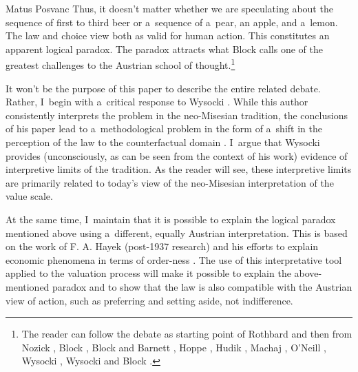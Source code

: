 \begin{artengenv}{Matus Posvanc}
Thus, it doesn't matter whether we are speculating about the sequence of first to third beer or a~sequence of a~pear, an apple, and a~lemon. The law and choice view both as valid for human action. This constitutes an apparent logical paradox. The paradox attracts what Block 
\parencite*[][]{Block1980On} %
 calls one of the greatest challenges to the Austrian school of thought.\footnote{The reader can follow the debate as starting point of Rothbard 
\parencite*[][]{Rothbard1997Toward} %
 and then from Nozick 
\parencite*[][]{Nozick1977On}, %
 Block 
\parencites*[][]{Block1980On}[][]{Block2009Rejoinder}[][]{Block2012Response}, %
 Block and Barnett 
\parencite*[][]{Block2010Rejoinder}, %
 Hoppe 
\parencites*[][]{Hoppe2005Must}[][]{Hoppe2009Further}, %
 Hudik 
\parencite*[][]{Hudik2011note}, %
 Machaj 
\parencite*[][]{Machaj2007praxeological}, %
 O'Neill 
\parencite*[][]{ONeill2010Choice}, %
 Wysocki 
\parencites*[][]{Wysocki2016Indifference}[][]{Wysocki2021problem}, %
 Wysocki and Block 
\parencites*[][]{Wysocki2018analysis}[][]{Wysocki2019Homogeneity}.%
}



It won't be the purpose of this paper to describe the entire related debate. Rather, I~begin with a~critical response to Wysocki 
\parencite*[][]{Wysocki2021problem}. %
 While this author consistently interprets the problem in the neo-Misesian tradition, the conclusions of his paper lead to a~methodological problem in the form of a~shift in the perception of the law to the counterfactual domain 
\parencite[][pp.41–42]{Wysocki2021problem}. %
 I~argue that Wysocki 
\parencite*[][]{Wysocki2021problem} %
 provides (unconsciously, as can be seen from the context of his work) evidence of interpretive limits of the tradition. As the reader will see, these interpretive limits are primarily related to today's view of the neo-Misesian interpretation of the value scale.



At the same time, I~maintain that it is possible to explain the logical paradox mentioned above using a~different, equally Austrian interpretation. This is based on the work of F. A. Hayek (post-1937 research) and his efforts to explain economic phenomena in terms of order-ness 
\parencites[see e.g.,][]{Caldwell2014Introduction}[][]{Lewis2015Orders}. %
 The use of this interpretative tool applied to the valuation process will make it possible to explain the above-mentioned paradox and to show that the law is also compatible with the Austrian view of action, such as preferring and setting aside, not indifference.




\end{artengenv}
